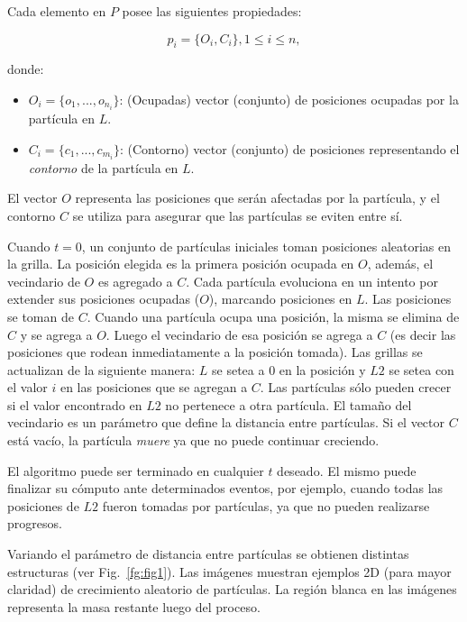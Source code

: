 \documentclass[oneside,a4paper,spanish,links]{amca}
\begin{document}
Cada elemento en $P$ posee las siguientes propiedades:

\begin{equation}
  p_{i} = \{O_{i}, C_{i}\}, 1 \le i \le n,
\end{equation}

\noindent donde:

\begin{itemize}
\item $O_{i} = \{o_{1}, ... , o_{n_{i}}\}$: (Ocupadas) vector (conjunto) de posiciones ocupadas por la part\'icula en $L$.

\item $C_{i} = \{c_{1}, ... , c_{m_{i}}\}$: (Contorno) vector (conjunto) de posiciones representando el {\em contorno} de la part\'icula en $L$.
\end{itemize}

El vector $O$ representa las posiciones que ser\'an afectadas por la part\'icula, y el contorno $C$ se utiliza para asegurar que las part\'iculas se eviten entre s\'i.

Cuando $t = 0$, un conjunto de part\'iculas iniciales toman posiciones aleatorias en la grilla. La posici\'on elegida es la primera posici\'on ocupada en $O$, adem\'as, el vecindario de $O$ es agregado a $C$. Cada part\'icula evoluciona en un intento por extender sus posiciones ocupadas ($O$), marcando posiciones en $L$. Las posiciones se toman de $C$. Cuando una part\'icula ocupa una posici\'on, la misma se elimina de $C$ y se agrega a $O$. Luego el vecindario de esa posici\'on se agrega a $C$ (es decir las posiciones que rodean inmediatamente a la posici\'on tomada). Las grillas se actualizan de la siguiente manera: $L$ se setea a $0$ en la posici\'on y $L2$ se setea con el valor $i$ en las posiciones que se agregan a $C$. Las part\'iculas s\'olo pueden crecer si el valor encontrado en $L2$ no pertenece a otra part\'icula. El tama\~no del vecindario es un par\'ametro que define la distancia entre part\'iculas. Si el vector $C$ est\'a vac\'io, la part\'icula {\em muere} ya que no puede continuar creciendo.

El algoritmo puede ser terminado en cualquier $t$ deseado. El mismo puede finalizar su c\'omputo ante determinados eventos, por ejemplo, cuando todas las posiciones de $L2$ fueron tomadas por part\'iculas, ya que no pueden realizarse progresos.

Variando el par\'ametro de distancia entre part\'iculas se obtienen distintas estructuras (ver Fig.~\ref{fg:fig1}). Las im\'agenes muestran ejemplos 2D (para mayor claridad) de crecimiento aleatorio de part\'iculas. La regi\'on blanca en las im\'agenes representa la masa restante luego del proceso.
\end{document}
